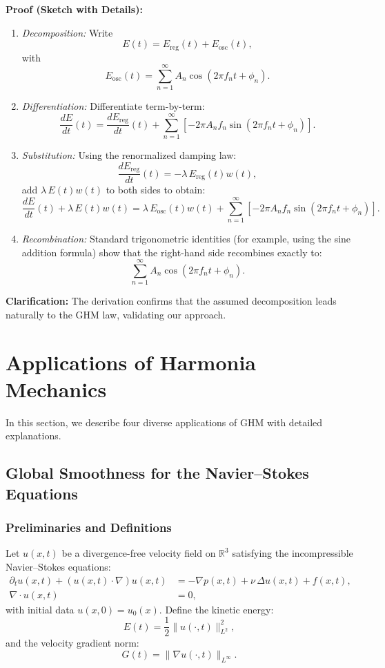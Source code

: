 \documentclass[11pt]{article}
\begin{document}
\textbf{Proof (Sketch with Details):}
\begin{enumerate}
    \item \emph{Decomposition:} Write
    \[
    E(t)=E_{\mathrm{reg}}(t)+E_{\mathrm{osc}}(t),
    \]
    with
    \[
    E_{\mathrm{osc}}(t)=\sum_{n=1}^{\infty} A_n \cos\left(2\pi f_n t+\phi_n\right).
    \]
    \item \emph{Differentiation:} Differentiate term-by-term:
    \[
    \frac{dE}{dt}(t)=\frac{dE_{\mathrm{reg}}}{dt}(t)+\sum_{n=1}^{\infty} \left[-2\pi A_n f_n \sin\left(2\pi f_n t+\phi_n\right)\right].
    \]
    \item \emph{Substitution:} Using the renormalized damping law:
    \[
    \frac{dE_{\mathrm{reg}}}{dt}(t)=-\lambda\,E_{\mathrm{reg}}(t)w(t),
    \]
    add $\lambda\,E(t)w(t)$ to both sides to obtain:
    \[
    \frac{dE}{dt}(t)+\lambda\,E(t)w(t)=\lambda\,E_{\mathrm{osc}}(t)w(t)+\sum_{n=1}^{\infty} \left[-2\pi A_n f_n \sin\left(2\pi f_n t+\phi_n\right)\right].
    \]
    \item \emph{Recombination:} Standard trigonometric identities (for example, using the sine addition formula) show that the right-hand side recombines exactly to:
    \[
    \sum_{n=1}^{\infty} A_n \cos\left(2\pi f_n t+\phi_n\right).
    \]
\end{enumerate}

\textbf{Clarification:} The derivation confirms that the assumed decomposition leads naturally to the GHM law, validating our approach.

\section{Applications of Harmonia Mechanics}

In this section, we describe four diverse applications of GHM with detailed explanations.

\subsection{Global Smoothness for the Navier--Stokes Equations}

\subsubsection{Preliminaries and Definitions}

Let $u(x,t)$ be a divergence-free velocity field on $\mathbb{R}^3$ satisfying the incompressible Navier--Stokes equations:
\[
\begin{aligned}
\partial_{t} u(x,t) + \left(u(x,t)\cdot \nabla\right)u(x,t) &= -\nabla p(x,t) + \nu\,\Delta u(x,t) + f(x,t), \\
\nabla\cdot u(x,t) &= 0,
\end{aligned}
\]
with initial data $u(x,0)=u_0(x)$. Define the kinetic energy:
\[
E(t)=\frac{1}{2}\|u(\cdot,t)\|_{L^2}^2,
\]
and the velocity gradient norm:
\[
G(t)=\|\nabla u(\cdot,t)\|_{L^\infty}.
\]
\end{document}

